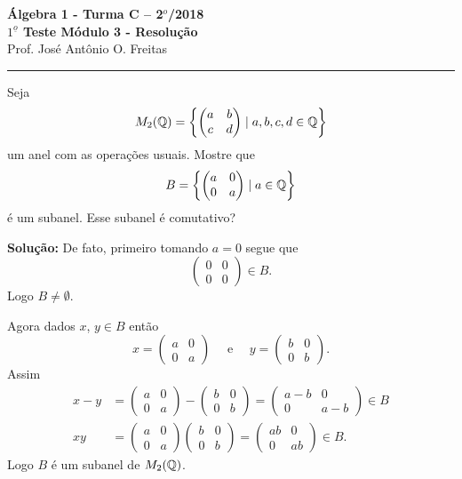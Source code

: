 \documentclass[12pt]{article}
\begin{document}


\begin{center}
{\Large\bf {\'A}lgebra 1 - Turma C -- 2$^{o}$/2018} \\ \vspace{9pt} {\large\bf
  $1^{\underline{o}}$ Teste Módulo 3 - Resolu\c{c}\~ao}\\
\vspace{9pt} Prof. Jos{\'e} Ant{\^o}nio O. Freitas
\end{center}
\hrule

\vspace{.6cm}

\questao Seja
\[
	M_2(\mathbb{Q}) = \left\{ \begin{pmatrix}
		a & b\\c & d
	\end{pmatrix} \mid a,b,c,d \in \mathbb{Q}\right\}
\]
um anel com as operações usuais. Mostre que
\[
	B = \left\{ \begin{pmatrix}
		a & 0\\0 & a
	\end{pmatrix} \mid a \in \mathbb{Q}\right\}	
\]
é um subanel. Esse subanel é comutativo?

\noindent\textbf{Solu\c{c}\~ao:} De fato, primeiro tomando $a = 0$ segue que
\[
	\begin{pmatrix}
		0 & 0\\0 & 0
	\end{pmatrix} \in B.
\]
Logo $B \ne \emptyset$.

Agora dados $x$, $y \in B$ então
\[
	x = \begin{pmatrix}
		a & 0\\0 & a
	\end{pmatrix}\quad \mbox{ e } \quad y = \begin{pmatrix}
		b & 0\\0 & b
	\end{pmatrix}.
\]
Assim
\begin{align*}
	x - y &= \begin{pmatrix}
		a & 0\\0 & a
	\end{pmatrix} - \begin{pmatrix}
		b & 0\\0 & b
	\end{pmatrix} = \begin{pmatrix}
		a - b & 0\\0 & a - b
	\end{pmatrix} \in B\\
	xy &= \begin{pmatrix}
		a & 0\\0 & a
	\end{pmatrix}\begin{pmatrix}
		b & 0\\0 & b
	\end{pmatrix} = \begin{pmatrix}
		ab & 0\\0 & ab
	\end{pmatrix} \in B.
\end{align*}
Logo $B$ é um subanel de $M_2(\mathbb{Q})$.
\end{document}

